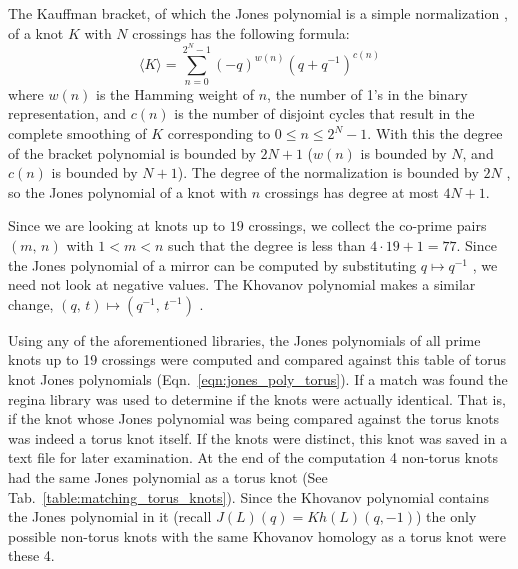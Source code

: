 \documentclass{article}
\theoremstyle{plain}
\begin{document}
        The Kauffman bracket, of which the Jones polynomial is a simple
        normalization \cite{BarNatanKhovanovJones},
        of a knot $K$ with $N$ crossings has the following formula:
        \begin{equation}
            \langle{K}\rangle=\sum_{n=0}^{2^{N}-1}(-q)^{w(n)}(q+q^{-1})^{c(n)}
        \end{equation}
        where $w(n)$ is the Hamming weight of $n$, the number of 1's in the
        binary representation, and $c(n)$ is the number of disjoint cycles
        that result in the complete smoothing of $K$ corresponding to
        $0\leq{n}\leq{2}^{N}-1$. With this the degree of the bracket polynomial
        is bounded by $2N+1$ ($w(n)$ is bounded by $N$, and $c(n)$ is bounded
        by $N+1$). The degree of the normalization is bounded by $2N$
        \cite{BarNatanKhovanovJones}, so the
        Jones polynomial of a knot with $n$ crossings has degree at most
        $4N+1$.
        \par\hfill\par
        Since we are looking at knots up to $19$ crossings, we collect the
        co-prime pairs $(m,\,n)$ with $1<m<n$ such that the degree
        is less than $4\cdot{19}+1=77$. Since the Jones polynomial of a mirror
        can be computed by substituting $q\mapsto{q}^{-1}$
        \cite{jonespolyjones}, we need not look at
        negative values. The Khovanov polynomial makes a similar change,
        $(q,\,t)\mapsto(q^{-1},\,t^{-1})$
        \cite{WATSON2017915}.
        \par\hfill\par
        Using any of the aforementioned libraries, the Jones polynomials of all
        prime knots up to 19 crossings were computed and compared against this
        table of torus knot Jones polynomials (Eqn.~\ref{eqn:jones_poly_torus}).
        If a match was found the regina library was used to determine if the
        knots were actually identical. That is, if the knot whose Jones
        polynomial was being compared against the torus knots was indeed a
        torus knot itself. If the knots were distinct, this knot was saved in a
        text file for later examination. At the end of the computation 4
        non-torus knots had the same Jones polynomial as a torus knot
        (See Tab.~\ref{table:matching_torus_knots}).
        Since the Khovanov polynomial contains the Jones polynomial in it
        (recall $J(L)(q)=Kh(L)(q,-1)$) the only possible non-torus knots with
        the same Khovanov homology as a torus knot were these 4.
\end{document}
